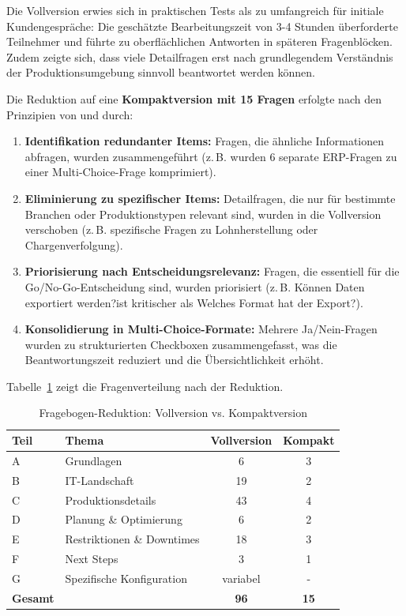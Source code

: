 \noindent Die Vollversion erwies sich in praktischen Tests als zu umfangreich für initiale Kundengespräche: Die geschätzte Bearbeitungszeit von 3-4 Stunden überforderte Teilnehmer und führte zu oberflächlichen Antworten in späteren Fragenblöcken. Zudem zeigte sich, dass viele Detailfragen erst nach grundlegendem Verständnis der Produktionsumgebung sinnvoll beantwortet werden können.

\noindent Die Reduktion auf eine \textbf{Kompaktversion mit 15 Fragen} \citep{grace:onboarding_fragebogen_kompakt2025} erfolgte nach den Prinzipien von \cite{devellis:scale_development2017} und \cite{buehner:test_fragebogenkonstruktion2004} durch:

\begin{enumerate}
    \item \textbf{Identifikation redundanter Items:} Fragen, die ähnliche Informationen abfragen, wurden zusammengeführt (z.\,B. wurden 6 separate ERP-Fragen zu einer Multi-Choice-Frage komprimiert).

    \item \textbf{Eliminierung zu spezifischer Items:} Detailfragen, die nur für bestimmte Branchen oder Produktionstypen relevant sind, wurden in die Vollversion verschoben (z.\,B. spezifische Fragen zu Lohnherstellung oder Chargenverfolgung).

    \item \textbf{Priorisierung nach Entscheidungsrelevanz:} Fragen, die essentiell für die Go/No-Go-Entscheidung sind, wurden priorisiert (z.\,B. \glqq Können Daten exportiert werden?\grqq ist kritischer als \glqq Welches Format hat der Export?\grqq).

    \item \textbf{Konsolidierung in Multi-Choice-Formate:} Mehrere Ja/Nein-Fragen wurden zu strukturierten Checkboxen zusammengefasst, was die Beantwortungszeit reduziert und die Übersichtlichkeit erhöht.
\end{enumerate}

Tabelle~\ref{tab:fragebogen_reduktion} zeigt die Fragenverteilung nach der Reduktion.

\begin{table}[h]
\centering
\caption{Fragebogen-Reduktion: Vollversion vs. Kompaktversion}
\label{tab:fragebogen_reduktion}
\begin{tabular}{llcc}
\toprule
\textbf{Teil} & \textbf{Thema} & \textbf{Vollversion} & \textbf{Kompakt} \\
\midrule
A & Grundlagen & 6 & 3 \\
B & IT-Landschaft & 19 & 2 \\
C & Produktionsdetails & 43 & 4 \\
D & Planung \& Optimierung & 6 & 2 \\
E & Restriktionen \& Downtimes & 18 & 3 \\
F & Next Steps & 3 & 1 \\
G & Spezifische Konfiguration & variabel & - \\
\midrule
\textbf{Gesamt} & & \textbf{96} & \textbf{15} \\
\bottomrule
\end{tabular}
\end{table}

